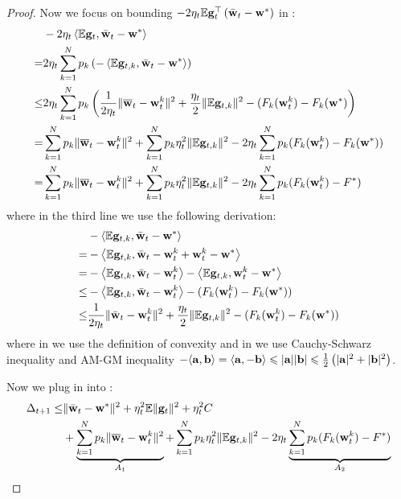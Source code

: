 \begin{proof}
Now we focus on bounding $-2 \eta_{t} \mathbb{E} {\mathbf{g}}_{t}^{\top}\left(\bar{{\mathbf{w}}}_{t}-{\mathbf{w}}^{*}\right)$ in \eq{\ref{eq:expand}}: 
\begin{align}
	& -2 \eta_{t} \left<\mathbb{E} {\mathbf{g}}_{t}, \bar{{\mathbf{w}}}_{t}-{\mathbf{w}}^{*} \right>\\
  = & 2 \eta_{t} \sum_{k=1}^N p_k \left(-\left<\mathbb{E} {\mathbf{g}}_{t,k}, \bar{{\mathbf{w}}}_{t}-{\mathbf{w}}^{*} \right> \right) \\
  \leq& 2 \eta_{t} \sum_{k=1}^N p_k  \left(\frac{1}{2\eta_t} \|\overline{{\mathbf{w}}}_t - {\mathbf{w}}_t^k\|^2 + \frac{\eta_t}{2} \|\mathbb{E} {\mathbf{g}}_{t,k}\|^2 - (F_k({\mathbf{w}}_t^k) - F_k({\mathbf{w}}^*) \right) \\
  =& \sum_{k=1}^N p_k \|\overline{{\mathbf{w}}}_t - {\mathbf{w}}_t^k\|^2 +  \sum_{k=1}^N p_k \eta_t^2 \|\mathbb{E} {\mathbf{g}}_{t,k}\|^2 
  - 2\eta_t\sum_{k=1}^N p_k (F_k({\mathbf{w}}_t^k) - F_k({\mathbf{w}}^*)) \\
  =& \sum_{k=1}^N p_k \|\overline{{\mathbf{w}}}_t - {\mathbf{w}}_t^k\|^2 +  \sum_{k=1}^N p_k \eta_t^2 \|\mathbb{E} {\mathbf{g}}_{t,k}\|^2 
  - 2\eta_t\sum_{k=1}^N p_k (F_k({\mathbf{w}}_t^k) - F^*) \label{eq:exp4}
\end{align}
where in the third line we use the following derivation:
\begin{align}
	& -\left<\mathbb{E} {\mathbf{g}}_{t,k}, \bar{{\mathbf{w}}}_{t} - {\mathbf{w}}^{*} \right>\\
=& - \left<\mathbb{E} {\mathbf{g}}_{t,k}, \bar{{\mathbf{w}}}_{t} - {\mathbf{w}}_t^k +  {\mathbf{w}}_t^k - {\mathbf{w}}^{*} \right>\\
=& - \left<\mathbb{E} {\mathbf{g}}_{t,k}, \bar{{\mathbf{w}}}_{t} - {\mathbf{w}}_t^k\right> - \left<\mathbb{E} {\mathbf{g}}_{t,k}, {\mathbf{w}}_t^k - {\mathbf{w}}^{*} \right>\\
\leq & - \left<\mathbb{E} {\mathbf{g}}_{t,k}, \bar{{\mathbf{w}}}_{t} - {\mathbf{w}}_t^k\right> - (F_k({\mathbf{w}}_t^k) - F_k({\mathbf{w}}^*)) \label{eq:3}\\
\leq & \frac{1}{2\eta_t} \|\bar{{\mathbf{w}}}_t - {\mathbf{w}}_t^k\|^2 + \frac{\eta_t}{2} \|\mathbb{E} {\mathbf{g}}_{t,k}\|^2
- (F_k({\mathbf{w}}_t^k) - F_k({\mathbf{w}}^*)) \label{eq:4}
\end{align}
where in \eq{\ref{eq:3}} we use the definition of convexity and in \eq{\ref{eq:4}} we use Cauchy-Schwarz inequality and AM-GM inequality $-\langle{\mathbf{a}}, {\mathbf{b}}\rangle=\langle{\mathbf{a}},-{\mathbf{b}}\rangle \leqslant|{\mathbf{a}}||{\mathbf{b}}| \leqslant \frac{1}{2}\left(|{\mathbf{a}}|^{2}+|{\mathbf{b}}|^{2}\right)$.


Now we plug in \eq{\ref{eq:exp4}} into \eq{\ref{eq:expand}}:
\begin{align}
	\Delta_{t+1} \leq& \|\bar{{\mathbf{w}}}_{t}-{\mathbf{w}}^{*}\|^{2} + \eta_{t}^{2} \mathbb{E}\| {\mathbf{g}}_{t} \|^{2}  + \eta_t^2 C \\
	& + \underbrace{\sum_{k=1}^N p_k \|\overline{{\mathbf{w}}}_t - {\mathbf{w}}_t^k\|^2}_{A_1} +  \sum_{k=1}^N p_k \eta_t^2 \|\mathbb{E} {\mathbf{g}}_{t,k}\|^2
  - 2\eta_t\underbrace{\sum_{k=1}^N p_k (F_k({\mathbf{w}}_t^k) - F^*)}_{A_2} \label{eq:main2}
\end{align}


\end{proof}
